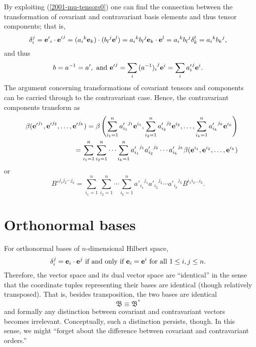 By exploiting (\ref{2001-mu-tensors0}) one can find the connection between
the transformation of covariant and contravariant basis elements and thus
tensor components; that is,
\begin{equation}
\delta_i^j= {{\bf e}'}_i\cdot {{\bf e}'}^j=({a_i}^k{\bf e}_k)\cdot ({b_l}^j{\bf e}^l)={a_i}^k {b_l}^j {\bf e}_k\cdot {\bf e}^l={a_i}^k{b_l}^j \delta_k^l
={a_i}^k {b_k}^j,
\end{equation}
and thus
\begin{equation}
b=a^{-1} =a',\textrm{ and } {{\bf e}'}^j=\sum_i{(a^{-1})_i}^j{\bf e}^i=\sum_i{ a'_i}^j{\bf e}^i.
\label{2012-m-ch-tensor-tocontrav}
\end{equation}
The argument concerning transformations of covariant tensors and components
can be carried through to the contravariant case.
Hence, the contravariant components transform as
\begin{eqnarray}
&&\beta ( {{\bf e}'}^{j_1},{{\bf e}'}^{j_2},\ldots ,{{\bf e}'}^{j_k})=
\beta \left(
\sum_{i_1=1}^n {a'_{i_1}}^{j_1} {\bf e}^{i_1},
\sum_{i_2=1}^n {a'_{i_2}}^{j_2} {\bf e}^{i_2},
\ldots ,
\sum_{i_k=1}^n {a'_{i_k}}^{j_k} {\bf e}^{i_k}
\right)
\nonumber \\&& \quad
=
\sum_{i_1=1}^n\sum_{i_2=1}^n\cdots \sum_{i_k=1}^n
{a'_{i_1}}^{j_1}{a'_{i_2}}^{j_2}\cdots {a'_{i_k}}^{j_k} \beta ( {\bf e}^{i_1},{\bf e}^{i_2},\ldots ,{\bf e}^{i_k})
 \label{2012-m-ch-tensor-etotccon1}
\end{eqnarray}
or
\begin{equation}
B'^{{j_1}{j_2}\cdots {j_k}}=
\sum_{i_1=1}^n\sum_{i_2=1}^n\cdots \sum_{i_k=1}^n
{a'_{i_1}}^{j_1}{a'_{i_2}}^{j_2}\cdots {a'_{i_k}}^{j_k} B^{i_1 i_2\ldots i_k}.
 \label{2012-m-ch-tensor-etotccon2}
\end{equation}


\section{Orthonormal bases}
For orthonormal bases of $n$-dimensional Hilbert space,
\begin{equation}
\delta_i^j = {\bf e}_i\cdot {\bf e}^j
\textrm { if and only if }
{\bf e}_i= {\bf e}^i  \textrm { for all } 1\le i,j \le n.
\end{equation}
Therefore, the vector space and its dual vector space are ``identical''
in the sense that the coordinate tuples representing their bases are identical
(though relatively transposed).
That is, besides transposition, the two bases are identical
\begin{equation}
{\mathfrak B}\equiv {\mathfrak B}^\ast
\end{equation}
and  formally any distinction between covariant and contravariant vectors becomes
irrelevant. Conceptually, such a distinction persists, though.
In this sense, we might ``forget about the difference between
covariant and contravariant orders.''



